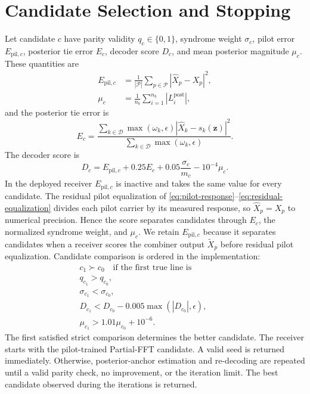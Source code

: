 \documentclass[conference]{IEEEtran}
\newcommand{\Pset}{\mathcal{P}}
\newcommand{\Dset}{\mathcal{D}}
\begin{document}
\section{Candidate Selection and Stopping}

Let candidate \(c\) have parity validity \(q_c\in\{0,1\}\), syndrome weight
\(\sigma_c\), pilot error \(E_{\mathrm{pil},c}\), posterior tie error \(E_c\),
decoder score \(D_c\), and mean posterior magnitude \(\mu_c\).  These
quantities are
\begin{align}
  E_{\mathrm{pil},c}
  &=
  \frac{1}{|\Pset|}
  \sum_{p\in\Pset}
  \left|\widehat X_p-X_p\right|^2,
  \label{eq:pilot-error}\\
  \mu_c
  &=
  \frac{1}{n_b}
  \sum_{i=1}^{n_b}
  \left|L_i^{\mathrm{post}}\right|,
  \label{eq:posterior-magnitude}
\end{align}
and the posterior tie error is
\begin{equation}
  E_c
  =
  \frac{
  \displaystyle
  \sum_{k\in\Dset}
  \max(\omega_k,\epsilon)
  \left|
  \widehat X_k-s_k(\mathbf z)
  \right|^2
  }{
  \displaystyle
  \sum_{k\in\Dset}
  \max(\omega_k,\epsilon)
  }.
  \label{eq:tie-error}
\end{equation}
The decoder score is
\begin{equation}
  D_c
  =
  E_{\mathrm{pil},c}
  +0.25E_c
  +0.05\frac{\sigma_c}{m_c}
  -10^{-4}\mu_c.
  \label{eq:decoder-score}
\end{equation}
In the deployed receiver \(E_{\mathrm{pil},c}\) is inactive and takes the same
value for every candidate.  The residual pilot equalization of
\eqref{eq:pilot-response}--\eqref{eq:residual-equalization} divides each pilot
carrier by its measured response, so \(\widehat X_p=X_p\) to numerical
precision.  Hence the score separates candidates through \(E_c\), the
normalized syndrome weight, and \(\mu_c\).  We retain
\(E_{\mathrm{pil},c}\) because it separates candidates when a receiver scores
the combiner output \(\widetilde X_p\) before residual pilot equalization.
Candidate comparison is ordered in the implementation:
\begin{equation}
  \begin{aligned}
    c_1\succ c_0
    \quad\text{if the first true line is}\quad&\\
    q_{c_1}>q_{c_0},\qquad&\\
    \sigma_{c_1}<\sigma_{c_0},\qquad&\\
    D_{c_1}<D_{c_0}
    -0.005\max(|D_{c_0}|,\epsilon),\qquad&\\
    \mu_{c_1}>1.01\mu_{c_0}+10^{-6}.&
  \end{aligned}
  \label{eq:candidate-order}
\end{equation}
The first satisfied strict comparison determines the better candidate.  The
receiver starts with the pilot-trained Partial-FFT candidate.  A valid seed is
returned immediately.  Otherwise, posterior-anchor estimation and re-decoding are
repeated until a valid parity check, no improvement, or the iteration limit.
The best candidate observed during the iterations is returned.
\end{document}
